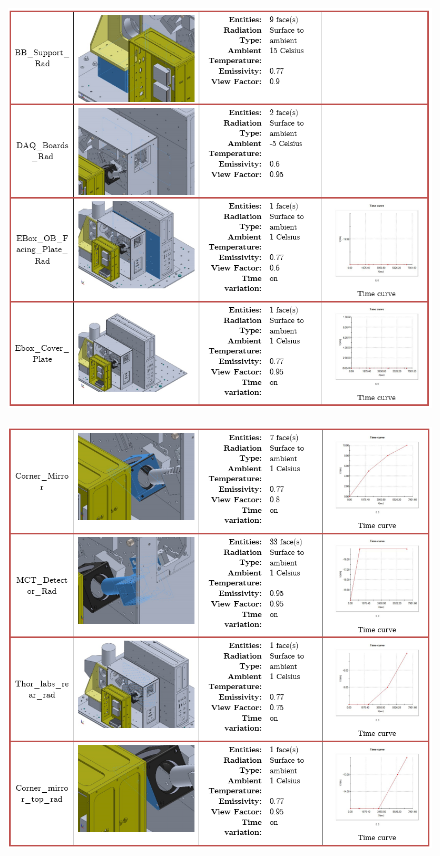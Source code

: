 \begin{figure}
    \centering
    \includegraphics[width=\textwidth]{thermal_load_images/ascent_pt2_TL_images/ascesnt_pt2_7.PNG}
\end{figure}

\begin{figure}
    \centering
    \includegraphics[width=\textwidth]{thermal_load_images/ascent_pt2_TL_images/ascesnt_pt2_8.PNG}
\end{figure}

